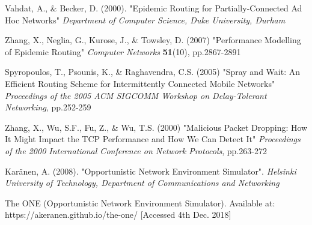 \documentclass{article}
\begin{document}
\begin{thebibliography}{20}
Vahdat, A., \& Becker, D. (2000).
"Epidemic Routing for Partially-Connected Ad Hoc Networks"
\textit{Department of Computer Science, Duke University, Durham}

Zhang, X., Neglia, G., Kurose, J., \& Towsley, D. (2007)
"Performance Modelling of Epidemic Routing"
\textit{Computer Networks} \textbf{51}(10), pp.2867-2891

Spyropoulos, T., Psounis, K., \& Raghavendra, C.S. (2005)
"Spray and Wait: An Efficient Routing Scheme for
Intermittently Connected Mobile Networks"
\textit{Proceedings of the 2005 ACM SIGCOMM Workshop on Delay-Tolerant Networking}, pp.252-259

Zhang, X., Wu, S.F., Fu, Z., \& Wu, T.S. (2000)
"Malicious Packet Dropping: How It Might Impact the TCP Performance and How
We Can Detect It"
\textit{Proceedings of the 2000 International Conference on Network Protocols}, pp.263-272

Karänen, A. (2008).
"Opportunistic Network Environment Simulator".
\textit{Helsinki University of Technology, Department of Communications and Networking}

The ONE (Opportunistic Network Environment Simulator). Available at: https://akeranen.github.io/the-one/ [Accessed 4th Dec. 2018]

\end{thebibliography}
 
\end{document}
